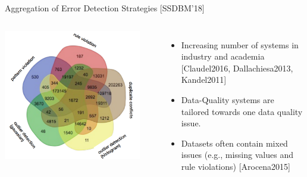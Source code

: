 \documentclass[aspectratio=169]{../latex_main/tntbeamer}  %
\begin{document}
\begin{frame}[c]{Aggregation of Error Detection Strategies [SSDBM’18]}

\begin{columns}

    
    \centering\includegraphics[width=0.9\textwidth]{figure/bild17_aggregation.png}



    \begin{itemize}
        \item Increasing number of systems in industry and academia [Claudel2016, Dallachiesa2013, Kandel2011]
        \item Data-Quality systems are tailored towards one data quality issue.
        \item Datasets often contain mixed issues (e.g., missing values and rule violations) [Arocena2015]
    \end{itemize}
    
\end{columns}


\end{frame}
\end{document}
